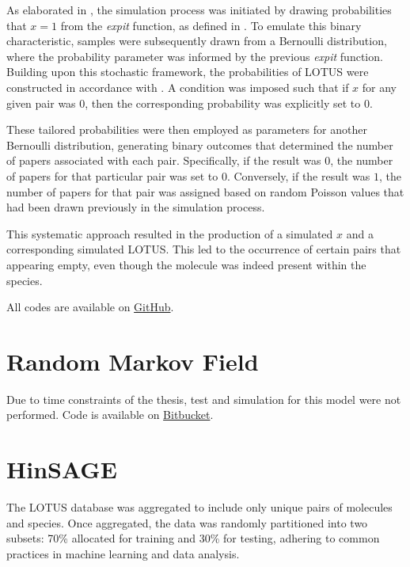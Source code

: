 \documentclass[
11pt, %
oneside, %
english, %
singlespacing, %
headsepline, %
chapterinoneline, %
]{MastersDoctoralThesis} %
\begin{document}
As elaborated in , the simulation process was initiated by drawing probabilities that $x=1$ from the \textit{expit} function, as defined in . 
To emulate this binary characteristic, samples were subsequently drawn from a Bernoulli distribution, where the probability parameter was informed by the previous \textit{expit} function. Building upon this stochastic framework, the probabilities of LOTUS were constructed in accordance with . A  condition was imposed such that if $x$ for any given pair was $0$, then the corresponding probability was explicitly set to $0$.

These tailored probabilities were then employed as parameters for another Bernoulli distribution, generating binary outcomes that determined the number of papers associated with each pair. Specifically, if the result was $0$, the number of papers for that particular pair was set to $0$. Conversely, if the result was $1$, the number of papers for that pair was assigned based on random Poisson values that had been drawn previously in the simulation process.

This systematic approach resulted in the production of a simulated $x$ and a corresponding simulated LOTUS. This led to the occurrence of certain pairs that appearing empty, even though the molecule was indeed present within the species.

All codes are available on \href{https://github.com/commons-research/anticipated-lotus}{GitHub}.
 
\section{Random Markov Field}
Due to time constraints of the thesis, test and simulation for this model were not performed. Code is available on \href{https://bitbucket.org/wegmannlab/metabolite_inference/src/master/}{Bitbucket}.

\section{HinSAGE}\label{sec:methods:HinSAGE}
The LOTUS database was aggregated to include only unique pairs of molecules and species. Once aggregated, the data was randomly partitioned into two subsets: 70\% allocated for training and 30\% for testing, adhering to common practices in machine learning and data analysis.
\end{document}
